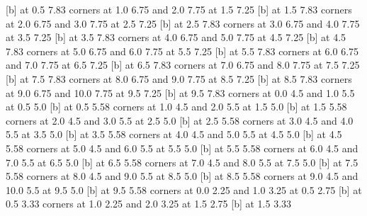  [b] at 0.5 7.83
\putrectangle corners at 1.0 6.75 and 2.0 7.75
 at 1.5 7.25
 [b] at 1.5 7.83
\putrectangle corners at 2.0 6.75 and 3.0 7.75
 at 2.5 7.25
 [b] at 2.5 7.83
\putrectangle corners at 3.0 6.75 and 4.0 7.75
 at 3.5 7.25
 [b] at 3.5 7.83
\putrectangle corners at 4.0 6.75 and 5.0 7.75
 at 4.5 7.25
 [b] at 4.5 7.83
\putrectangle corners at 5.0 6.75 and 6.0 7.75
 at 5.5 7.25
 [b] at 5.5 7.83
\putrectangle corners at 6.0 6.75 and 7.0 7.75
 at 6.5 7.25
 [b] at 6.5 7.83
\putrectangle corners at 7.0 6.75 and 8.0 7.75
 at 7.5 7.25
 [b] at 7.5 7.83
\putrectangle corners at 8.0 6.75 and 9.0 7.75
 at 8.5 7.25
 [b] at 8.5 7.83
\putrectangle corners at 9.0 6.75 and 10.0 7.75
 at 9.5 7.25
 [b] at 9.5 7.83
\putrectangle corners at 0.0 4.5 and 1.0 5.5
 at 0.5 5.0
 [b] at 0.5 5.58
\putrectangle corners at 1.0 4.5 and 2.0 5.5
 at 1.5 5.0
 [b] at 1.5 5.58
\putrectangle corners at 2.0 4.5 and 3.0 5.5
 at 2.5 5.0
 [b] at 2.5 5.58
\putrectangle corners at 3.0 4.5 and 4.0 5.5
 at 3.5 5.0
 [b] at 3.5 5.58
\putrectangle corners at 4.0 4.5 and 5.0 5.5
 at 4.5 5.0
 [b] at 4.5 5.58
\putrectangle corners at 5.0 4.5 and 6.0 5.5
 at 5.5 5.0
 [b] at 5.5 5.58
\putrectangle corners at 6.0 4.5 and 7.0 5.5
 at 6.5 5.0
 [b] at 6.5 5.58
\putrectangle corners at 7.0 4.5 and 8.0 5.5
 at 7.5 5.0
 [b] at 7.5 5.58
\putrectangle corners at 8.0 4.5 and 9.0 5.5
 at 8.5 5.0
 [b] at 8.5 5.58
\putrectangle corners at 9.0 4.5 and 10.0 5.5
 at 9.5 5.0
 [b] at 9.5 5.58
\putrectangle corners at 0.0 2.25 and 1.0 3.25
 at 0.5 2.75
 [b] at 0.5 3.33
\putrectangle corners at 1.0 2.25 and 2.0 3.25
 at 1.5 2.75
 [b] at 1.5 3.33

